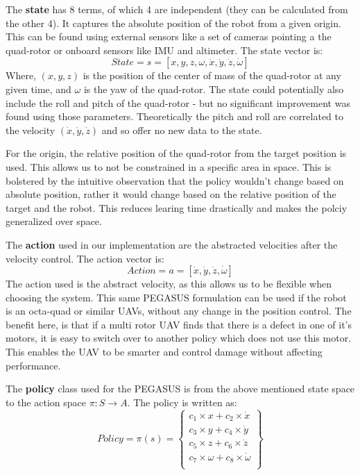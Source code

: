 \documentclass[hidelinks,BTech]{iitmdiss}
\begin{document}
The {\bf state} has 8 terms, of which 4 are independent (they can be calculated from the other 4). It captures the absolute position of the robot from a given origin. This can be found using external sensors like a set of cameras pointing a the quad-rotor or onboard sensors like IMU and altimeter. The state vector is:
\begin{equation}
  State = s = [x, y, z, \omega, \dot{x}, \dot{y}, \dot{z}, \dot{\omega}]
\end{equation}
Where, $(x, y, z)$ is the position of the center of mass of the quad-rotor at any given time, and $\omega$ is the yaw of the quad-rotor. The state could potentially also include the roll and pitch of the quad-rotor - but no significant improvement was found using those parameters. Theoretically the pitch and roll are correlated to the velocity $(\dot{x}, \dot{y}, \dot{z})$ and so offer no new data to the state.

For the origin, the relative position of the quad-rotor from the target position is used. This allows us to not be constrained in a specific area in space. This is bolstered by the intuitive observation that the policy wouldn't change based on absolute position, rather it would change based on the relative position of the target and the robot. This reduces learing time drastically and makes the polciy generalized over space.

The {\bf action} used in our implementation are the abstracted velocities after the velocity control. The action vector is:
\begin{equation}
  Action = a = [\dot{x}, \dot{y}, \dot{z}, \dot{\omega}]
\end{equation}
The action used is the abstract velocity, as this allows us to be flexible when choosing the system. This same PEGASUS formulation can be used if the robot is an octa-quad or similar UAVs, without any change in the position control. The benefit here, is that if a multi rotor UAV finds that there is a defect in one of it's motors, it is easy to switch over to another policy which does not use this motor. This enables the UAV to be smarter and control damage without affecting performance.

The {\bf policy} class used for the PEGASUS is from the above mentioned state space to the action space $\pi: S \rightarrow A$. The policy is written as:
\begin{equation}
  Policy = \pi(s) = \left\{
    \begin{array}{c}
      c_1 \times x + c_2 \times \dot{x} \\
      c_3 \times y + c_4 \times \dot{y} \\
      c_5 \times z + c_6 \times \dot{z} \\
      c_7 \times \omega + c_8 \times \dot{\omega} \\
    \end{array}
  \right\}
\end{equation}
\end{document}
